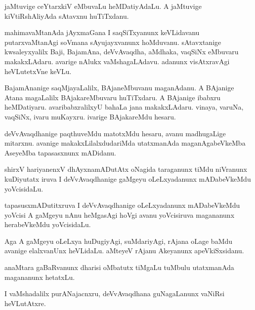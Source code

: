\documentclass{article}
\begin{document}
\begin{mn}
jaMtuvige ceYtarxkiV eMbuvaLu heMDatiyAdaLu. A jaMtuvige
kiVtiRshAliyAda sAtavxnu huTiTxdanu.
\end{mn}

\begin{mn}%
mahimavaMtanAda jAyxmaGana I saqSiTxyanunx keVLidavanu putarxvaMtanAgi
soVmana sAyujayxvanunx hoMduvanu. sAtavxtanige kwsaleyxyalilx Baji,
BajamAna, deVvAvaqdha, aMdhaka, vaqSiNx eMbuvaru makakxLAdaru. avarige
nAlukx vaMshagaLAdavu. adanunx visAtxravAgi heVLutetxVne keVLu.
\end{mn}

\begin{mn}%
BajamAnanige saqMjayaLalilx, BAjaneMbuvanu maganAdanu. A BAjanige
Atana magaLalilx BAjakareMbuvaru huTiTxdaru. A BAjanige ibabxru
heMDatiyaru. avaribabxralilxyU bahaLa jana makakxLAdaru. vinaya,
varuNa, vaqSiNx, ivaru muKayxru. ivarige BAjakareMdu hesaru.
\end{mn}

\begin{mn}%
deVvAvaqdhanige paqthuveMdu matotxMdu hesaru, avanu madhugaLige
mitarxnu. avanige makakxLilalxdudariMda utatxmanAda maganAgabeVkeMba
AseyeMba tapasasxnunx mADidanu.
\end{mn}

\begin{mn}
shirxV hariyanenxV dhAyxnamADutAtx oNagida taraganunx tiMdu niVranunx
kuDiyutatx iruva I deVvAvaqdhanige gaMgeyu oLeLxyadanunx mADabeVkeMdu yoVcisidaLu.
\end{mn}

\begin{mn}%
tapasusxmADutitxruva I deVvAvaqdhanige oLeLxyadanunx mADabeVkeMdu
yoVcisi A gaMgeyu nAnu heMgasAgi hoVgi avanu yoVcisiruva magananunx
herabeVkeMdu yoVcisidaLu.
\end{mn}

\begin{mn}%
Aga A gaMgeyu oLeLxya huDugiyAgi, suMdariyAgi, rAjana oLage baMdu
avanige elalxvanUnx heVLidaLu. aMteyeV rAjanu Akeyanunx apeVkiSxsidanu.
\end{mn}

\begin{mn}
anaMtara gaBaRvanunx dharisi oMbatutx tiMgaLu tuMbulu utatxmanAda
magananunx hetatxLu.
\end{mn}

\begin{mn}%
I vaMshadalilx purANajacnxru, deVvAvaqdhana guNagaLanunx vaNiRsi heVLutAtxre.
\end{mn}
\end{document}
